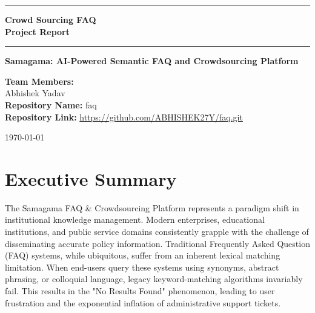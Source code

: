 \documentclass[12pt,a4paper]{article}
\begin{document}
\begin{titlepage}
    \begin{center}
        \vspace*{3cm}
        
        \rule{\textwidth}{1pt}
        \vspace{0.5cm}
        
        {\Huge \textbf{Crowd Sourcing FAQ \\ Project Report}}
        
        \vspace{0.5cm}
        \rule{\textwidth}{1pt}
        
        \vspace{2cm}
        
        {\Large \textbf{Samagama: AI-Powered Semantic FAQ and Crowdsourcing Platform}}
        
        \vspace{3cm}
        
        \textbf{Team Members:} \\
        \vspace{0.5cm}
        {\Large Abhishek Yadav} \\
        
        \vspace{3cm}
        \textbf{Repository Name:} faq \\
        \textbf{Repository Link:} \url{https://github.com/ABHISHEK27Y/faq.git}
        
        \vfill
        
        \Large \today
        
    \end{center}
\end{titlepage}

\newpage
{}
\tableofcontents
\newpage


\section{Executive Summary}
\vspace{0.5cm}

The Samagama FAQ \& Crowdsourcing Platform represents a paradigm shift in institutional knowledge management. Modern enterprises, educational institutions, and public service domains consistently grapple with the challenge of disseminating accurate policy information. Traditional Frequently Asked Question (FAQ) systems, while ubiquitous, suffer from an inherent lexical matching limitation. When end-users query these systems using synonyms, abstract phrasing, or colloquial language, legacy keyword-matching algorithms invariably fail. This results in the "No Results Found" phenomenon, leading to user frustration and the exponential inflation of administrative support tickets.
\end{document}
